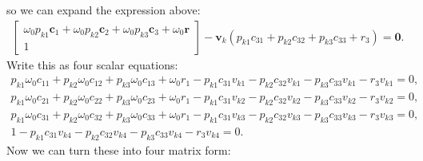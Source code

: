 \documentclass{article}
\begin{document}
so we can expand the expression above:
\begin{align}
    \begin{bmatrix}\omega_0 p_{k1} \mathbf{c}_1 + \omega_0 p_{k2} \mathbf{c}_2 + \omega_0 p_{k3} \mathbf{c}_3 + \omega_0 \mathbf{r} \\ 1\end{bmatrix} - \mathbf{v}_k (p_{k1}c_{31} + p_{k2} c_{32} + p_{k3} c_{33} + r_3) = \mathbf{0}.
\end{align}
Write this as four scalar equations:
\begin{align}
    p_{k1} \omega_0 c_{11} + p_{k2} \omega_0 c_{12} + p_{k3} \omega_0 c_{13} + \omega_0 r_1 - p_{k1} c_{31} v_{k1}- p_{k2} c_{32} v_{k1} - p_{k3} c_{33} v_{k1} - r_3 v_{k1}= 0,\\
    p_{k1} \omega_0 c_{21} + p_{k2} \omega_0 c_{22} + p_{k3} \omega_0 c_{23} + \omega_0 r_1 - p_{k1} c_{31} v_{k2}- p_{k2} c_{32} v_{k2} - p_{k3} c_{33} v_{k2} - r_3 v_{k2}= 0,\\
    p_{k1} \omega_0 c_{31} + p_{k2} \omega_0 c_{32} + p_{k3} \omega_0 c_{33} + \omega_0 r_1 - p_{k1} c_{31} v_{k3}- p_{k2} c_{32} v_{k3} - p_{k3} c_{33} v_{k3} - r_3 v_{k3}= 0,\\
    1 - p_{k1} c_{31} v_{k4}- p_{k2} c_{32} v_{k4} - p_{k3} c_{33} v_{k4} - r_3 v_{k4}= 0.
\end{align}
Now we can turn these into four matrix form:
\end{document}
